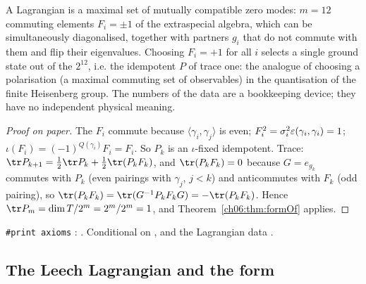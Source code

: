 \begin{physics}
A Lagrangian is a maximal set of mutually compatible zero modes: $m=12$ commuting elements $F_i=\pm1$ of the extraspecial algebra, which can be simultaneously diagonalised, together with partners $g_i$ that do not commute with them and flip their eigenvalues. Choosing $F_i=+1$ for all $i$ selects a single ground state out of the $2^{12}$, i.e. the idempotent $P$ of trace one: the analogue of choosing a polarisation (a maximal commuting set of observables) in the quantisation of the finite Heisenberg group. The numbers of the data are a bookkeeping device; they have no independent physical meaning.
\end{physics}
\begin{proof}[Proof on paper]
The $F_i$ commute because $\langle\gamma_i,\gamma_j\rangle$ is even; $F_i^2=\sigma_i^2
\varepsilon(\gamma_i,\gamma_i)=1$; $\iota(F_i)=(-1)^{Q(\gamma_i)}F_i=F_i$.  So $P_k$ is an
$\iota$-fixed idempotent.  Trace: $\tr P_{k+1}=\frac12\tr P_k+\frac12\tr(P_kF_k)$, and
$\tr(P_kF_k)=0$ because $G=e_{g_k}$ commutes with $P_k$ (even pairings with $\gamma_j$, $j<k$) and
anticommutes with $F_k$ (odd pairing), so
$\tr(P_kF_k)=\tr(G^{-1}P_kF_kG)=-\tr(P_kF_k)$.  Hence $\tr P_m=\dim T/2^m=2^m/2^m=1$, and
Theorem~\ref{ch06:thm:formOf} applies.
\end{proof}
\begin{status}
\texttt{\#print axioms} : .  Conditional on ,  and the Lagrangian data .
\end{status}

\subsection{The Leech Lagrangian and the form \texorpdfstring{}{TForm}}

